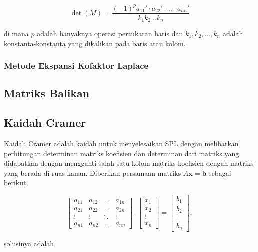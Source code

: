         \[
            \det(M) = \frac{(-1)^p a_{11}' \cdot a_{22}' \cdot \ldots \cdot a_{nn}'}{k_1 k_2 \ldots k_n}
        \]

        di mana $p$ adalah banyaknya operasi pertukaran baris dan $k_1, k_2, \ldots, k_n$ adalah konstanta-konstanta yang dikalikan pada baris atau kolom.
        
    \subsubsection{Metode Ekspansi Kofaktor Laplace}

    
\subsection{Matriks Balikan}
\subsection{Kaidah Cramer} 

Kaidah Cramer adalah kaidah untuk menyelesaikan SPL dengan melibatkan perhitungan determinan matriks koefisien dan determinan dari matriks yang didapatkan dengan mengganti salah satu kolom matriks koefisien dengan matriks yang berada di ruas kanan. Diberikan persamaan matriks $A \textbf{x} = \textbf{b}$ sebagai berikut,

\[
    \begin{bmatrix}
        a_{11} & a_{12} & \ldots & a_{1n} \\
        a_{21} & a_{22} & \ldots & a_{2n} \\
        \vdots & \vdots & \ddots & \vdots \\
        a_{n1} & a_{n2} & \ldots & a_{nn} 
    \end{bmatrix} \cdot 
    \begin{bmatrix}
        x_1\\
        x_2\\
        \vdots\\
        x_n
    \end{bmatrix}
    =
    \begin{bmatrix}
        b_1\\
        b_2\\
        \vdots\\
        b_n
    \end{bmatrix},
\]

solusinya adalah

